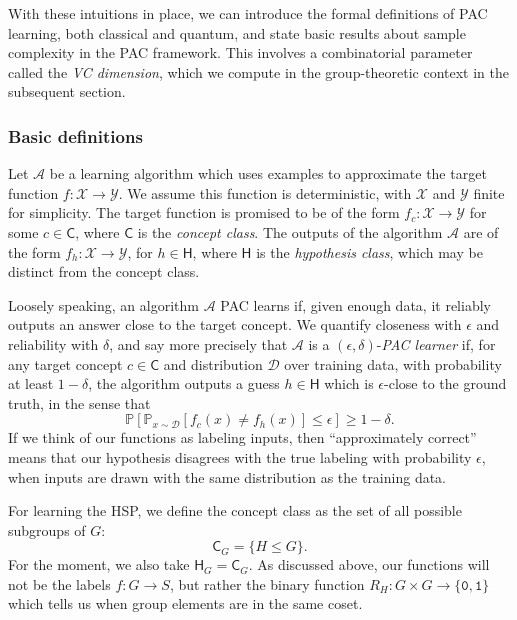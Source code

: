 \documentclass[aps, pre,reprint,nofootinbib,citeautoscript,floatfix]{revtex4-1}
\begin{document}
With these intuitions in place, we can introduce the formal
definitions of PAC learning, both classical and quantum, and state
basic results about sample complexity in the PAC framework. This
involves a combinatorial parameter called the \textit{VC dimension}, which we
compute in the group-theoretic context in the subsequent section.

\subsubsection{Basic definitions}
\label{sec:basic-definitions}

Let $\mathcal{A}$ be a learning algorithm which uses examples to approximate the target function $f: \mathcal{X} \to \mathcal{Y}$.
We assume this function is deterministic, with $\mathcal{X}$ and $\mathcal{Y}$ finite for simplicity.
The target function is promised to be of the form $f_c: \mathcal{X} \to \mathcal{Y}$ for some $c \in
\mathsf{C}$, where $\mathsf{C}$ is the \emph{concept class}.
The outputs of the algorithm $\mathcal{A}$ are of the form $f_h:
\mathcal{X}\to \mathcal{Y}$, for
$h \in \mathsf{H}$, where $\mathsf{H}$ is the \emph{hypothesis class},
which may be distinct from the concept class.

Loosely speaking, an algorithm $\mathcal{A}$ PAC learns if, given enough
data, it reliably outputs an answer close to the target concept.
We quantify closeness with $\epsilon$ and reliability with $\delta$,
and say more precisely that $\mathcal{A}$ is a
$(\epsilon, \delta)$-\emph{PAC learner} if, for any target concept $c \in \mathsf{C}$
and distribution $\mathcal{D}$ over training data, with probability at least $1 -
\delta$, the algorithm outputs a guess $h\in \mathsf{H}$ which is
$\epsilon$-close to the ground truth, in the sense that
\begin{equation}
  \label{eq:pac-def}
  \mathbb{P}\left[\mathbb{P}_{x \sim \mathcal{D}}[f_{c}(x) \neq
  f_{h}(x)] \leq \epsilon\right] \geq 1 - \delta.
\end{equation}
If we think of our functions as labeling inputs, then ``approximately
correct'' means that our hypothesis disagrees with the true labeling with probability $\epsilon$, when inputs are drawn with the
same distribution as the training data.

For learning the HSP, we define the concept class as the set of all
possible subgroups of $G$:
\begin{equation}
  \label{eq:concept}
  \mathsf{C}_G = \{H \leq G\}.
\end{equation}
For the moment, we also take $\mathsf{H}_G = \mathsf{C}_G$.
As discussed above, our functions will not be the labels $f : G \to
S$, but rather the binary function $R_H: G \times G \to \{\texttt{0}, \texttt{1}\}$
which tells us when group elements are in the same coset.
\end{document}
